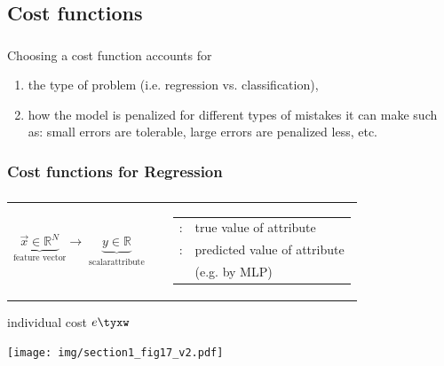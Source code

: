 \subsection{Cost functions}
\begin{frame}\frametitle{\subsecname}
Choosing a cost function accounts for 
\begin{enumerate}
\item the type of problem (i.e. regression vs. classification), 
\item how the model is penalized for different types of mistakes it can make such as:
small errors are tolerable, large errors are penalized less, etc.
\end{enumerate}
\end{frame}

\subsubsection{Cost functions for Regression}

\begin{frame}\frametitle{\subsecname}

  \begin{tabular}{c c c}
    \parbox{4cm}{
      \[ \underbrace{\vec{x}
          \in \mathbb{R}^N
      }_{\text{feature vector}}
      \longrightarrow 
      \underbrace{y
      \in \mathbb{R}
      }_{\substack{\text{scalar}\\ \text{attribute}}}
      \]}
    & & 
    \parbox{8cm}{\footnotesize
      \begin{tabular}{l l}
	$y_T(\vec x)$: & true value of attribute \\
	$y(\vec{x}; \vec w)$: & predicted value of attribute \\
					& (e.g. by MLP)
      \end{tabular}
    }
  \end{tabular}
     \pause

  \begin{block}{individual cost $e\tyxw$}
    \begin{center} \texttt{[image: img/section1\_fig17\_v2.pdf]} \end{center}
  \end{block}
\end{frame}

